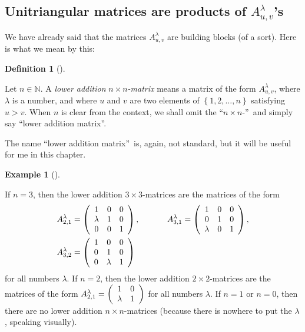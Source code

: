 \documentclass[numbers=enddot,12pt,final,onecolumn,notitlepage]{scrartcl}%
\theoremstyle{definition}
\newtheorem{defi}[theo]{Definition}
\newenvironment{definition}[1][]
{\begin{defi}[#1]\begin{leftbar}}
{\end{leftbar}\end{defi}}
\newtheorem{exam}[theo]{Example}
\newenvironment{example}[1][]
{\begin{exam}[#1]\begin{leftbar}}
{\end{leftbar}\end{exam}}
\begin{document}
\subsection{Unitriangular matrices are products of $A_{u,v}^{\lambda}$'s}

We have already said that the matrices $A_{u,v}^{\lambda}$ are building blocks
(of a sort). Here is what we mean by this:

\begin{definition}
Let $n\in\mathbb{N}$. A \textit{lower addition }$n\times n$\textit{-matrix}
means a matrix of the form $A_{u,v}^{\lambda}$, where $\lambda$ is a number,
and where $u$ and $v$ are two elements of $\left\{  1,2,\ldots,n\right\}  $
satisfying $u>v$. When $n$ is clear from the context, we shall omit the
\textquotedblleft$n\times n$-\textquotedblright\ and simply say
\textquotedblleft lower addition matrix\textquotedblright.
\end{definition}

The name \textquotedblleft lower addition matrix\textquotedblright\ is, again,
not standard, but it will be useful for me in this chapter.

\begin{example}
If $n=3$, then the lower addition $3\times3$-matrices are the matrices of the
form%
\begin{align*}
A_{2,1}^{\lambda} &  =\left(
\begin{array}
[c]{ccc}%
1 & 0 & 0\\
\lambda & 1 & 0\\
0 & 0 & 1
\end{array}
\right)  ,\ \ \ \ \ \ \ \ \ \ A_{3,1}^{\lambda}=\left(
\begin{array}
[c]{ccc}%
1 & 0 & 0\\
0 & 1 & 0\\
\lambda & 0 & 1
\end{array}
\right)  ,\\
A_{3,2}^{\lambda} &  =\left(
\begin{array}
[c]{ccc}%
1 & 0 & 0\\
0 & 1 & 0\\
0 & \lambda & 1
\end{array}
\right)
\end{align*}
for all numbers $\lambda$. If $n=2$, then the lower addition $2\times
2$-matrices are the matrices of the form $A_{2,1}^{\lambda}=\left(
\begin{array}
[c]{cc}%
1 & 0\\
\lambda & 1
\end{array}
\right)  $ for all numbers $\lambda$. If $n=1$ or $n=0$, then there are no
lower addition $n\times n$-matrices (because there is nowhere to put the
$\lambda$, speaking visually).
\end{example}
\end{document}
